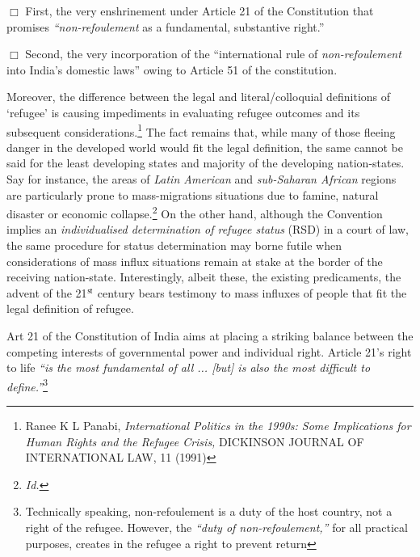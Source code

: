 \begin{multicols}{2}
\noi
$\Box$ First, the very enshrinement under Article 21 of the Constitution that promises \textit{“non-refoulement} as a fundamental, substantive right.”

\vspace{-.12cm}

\noi
$\Box$ Second, the very incorporation of the “international rule of \textit{non-refoulement} into India's
domestic laws” owing to Article 51 of the constitution.

\vspace{-.12cm}

\noi
Moreover, the difference between the legal and literal/colloquial definitions of ‘refugee’ is
causing impediments in evaluating refugee outcomes and its subsequent considerations.\footnote{Ranee K L Panabi, \textit{International Politics in the 1990s: Some Implications for Human Rights and the Refugee Crisis,} DICKINSON JOURNAL OF INTERNATIONAL LAW, 11 (1991)} The fact remains that, while many of those fleeing danger in the developed world would fit the legal definition, the same cannot be said for the least developing states and majority of the
developing nation-states. Say for instance, the areas of \textit{Latin American} and \textit{sub-Saharan
African} regions are particularly prone to mass-migrations situations due to famine, natural
disaster or economic collapse.\footnote{\textit{Id.}} On the other hand, although the Convention implies an
\textit{individualised determination of refugee status} (RSD) in a court of law, the same procedure for
status determination may borne futile when considerations of mass influx situations remain at
stake at the border of the receiving nation-state. Interestingly, albeit these, the existing
predicaments, the advent of the 21$^{\rm st}$ century bears testimony to mass influxes of people that
fit the legal definition of refugee.

\vspace{-.12cm}


\vspace{-.1cm}

\noi
Art 21 of the Constitution of India aims at placing a striking balance between the competing
interests of governmental power and individual right. Article 21's right to life \textit{“is the most
fundamental of all ... [but] is also the most difficult to define.”}\footnote{Technically speaking, non-refoulement is a duty of the host country, not a right of the refugee. However, the \textit{“duty of non-refoulement,”} for all practical purposes, creates in the refugee a right to prevent return}


\end{multicols}
